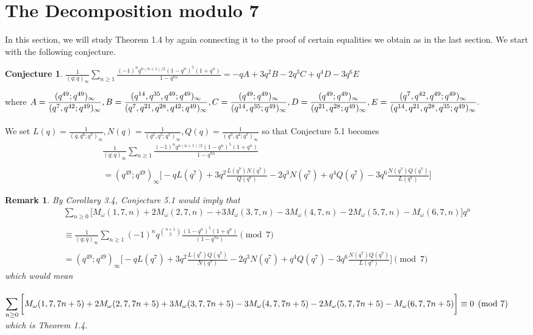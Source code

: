 \documentclass[10pt,reqno]{amsart}
\newtheorem{conjecture}[theorem]{Conjecture}
\newtheorem{remark}[]{Remark}
\begin{document}
\section{The Decomposition modulo 7}
In this section, we will study Theorem 1.4 by again connecting it to the proof of certain equalities we obtain as in the last section. We start with the following conjecture.
\begin{conjecture}
$\displaystyle\frac{1}{(q;q)_{\infty}}\displaystyle\sum_{n\geq 1}\displaystyle\frac{(-1)^nq^{n(n+1)/2}(1-q^n)^5(1+q^n)}{1-q^{7n}}=-qA+3q^2B-2q^3C+q^4D-3q^6E$
\end{conjecture}
where $A=\displaystyle\frac{(q^{49};q^{49})_{\infty}}{(q^{7},q^{42};q^{49})_{\infty}},B=\displaystyle\frac{(q^{14},q^{35},q^{49};q^{49})_{\infty}}{(q^{7},q^{21},q^{28},q^{42};q^{49})_{\infty}},C=\displaystyle\frac{(q^{49};q^{49})_{\infty}}{(q^{14},q^{35};q^{49})_{\infty}}, D=\displaystyle\frac{(q^{49};q^{49})_{\infty}}{(q^{21},q^{28};q^{49})_{\infty}},\\ \\ E=\displaystyle\frac{(q^{7},q^{42},q^{49};q^{49})_{\infty}}{(q^{14},q^{21},q^{28},q^{35};q^{49})_{\infty}}.$\\ \\
We set $L(q)=\displaystyle\frac{1}{(q,q^6;q^7)_{\infty}},N(q)=\displaystyle\frac{1}{(q^2,q^5;q^7)_{\infty}},Q(q)=\displaystyle\frac{1}{(q^3,q^4;q^7)_{\infty}}$ so that Conjecture 5.1 becomes 
\begin{multline*}
    \displaystyle\frac{1}{(q;q)_{\infty}}\displaystyle\sum_{n\geq 1}\displaystyle\frac{(-1)^nq^{n(n+1)/2}(1-q^n)^5(1+q^n)}{1-q^{7n}}\\ \\
    =(q^{49};q^{49})_{\infty}\Bigg[-qL(q^7)+3q^2\displaystyle\frac{L(q^7)N(q^7)}{Q(q^7)}-2q^3N(q^7)+q^4Q(q^7)-3q^6\displaystyle\frac{N(q^7)Q(q^7)}{L(q^7)}\Bigg]
\end{multline*}
\begin{remark}
By Corollary 3.4, Conjecture 5.1 would imply that 
\begin{multline*}
    \displaystyle\sum_{n\geq 0}\bigg[M_{\omega}(1,7,n)+2M_{\omega}(2,7,n)-+3M_{\omega}(3,7,n)-3M_{\omega}(4,7,n)-2M_{\omega}(5,7,n)-M_{\omega}(6,7,n)\bigg]q^n \\ \\  \equiv\displaystyle\frac{1}{(q;q)_{\infty}}\displaystyle\sum_{n\geq 1}(-1)^nq^{\binom{n+1}{2}}\displaystyle\frac{(1-q^n)^5(1+q^n)}{(1-q^{7n})}\pmod 7 \\ \\
    =(q^{49};q^{49})_{\infty}\Bigg[-qL(q^7)+3q^2\displaystyle\frac{L(q^7)Q(q^7)}{N(q^7)}-2q^3N(q^7)+q^4Q(q^7)-3q^6\displaystyle\frac{N(q^7)Q(q^7)}{L(q^7)}\Bigg]\pmod 7
\end{multline*}
which would mean \\ \\$\displaystyle\sum_{n\geq 0}\bigg[M_{\omega}(1,7,7n+5)+2M_{\omega}(2,7,7n+5)+3M_{\omega}(3,7,7n+5)-3M_{\omega}(4,7,7n+5)\\-2M_{\omega}(5,7,7n+5)-M_{\omega}(6,7,7n+5)\bigg]\equiv 0\pmod 7$ which is Theorem 1.4.

\end{remark}
\end{document}
